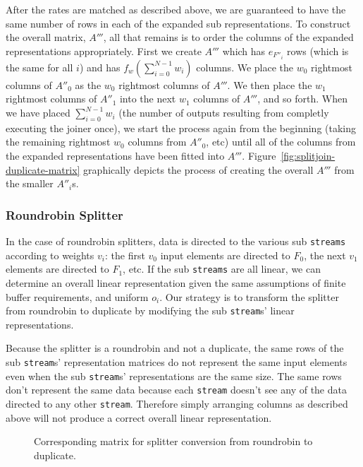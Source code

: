 After the rates are matched as described above, we are guaranteed to have the same number of rows
in each of the expanded sub representations. To construct the overall matrix, $A'''$, 
all that remains is to order the columns of the expanded representations appropriately. 
First we create $A'''$ which has $e_{F''_i}$ rows (which is the same for all $i$) and has 
$f_w(\sum_{i=0}^{N-1}w_i)$ columns. 
We place the $w_0$ rightmost columns of $A''_0$ as the $w_0$ rightmost 
columns of $A'''$. We then place the $w_1$ rightmost columns of $A''_1$ into the next $w_1$ columns 
of $A'''$, and so forth. When we have placed $\sum_{i=0}^{N-1}w_{i}$ (the number of outputs resulting from 
completly executing the joiner once), we start the process again from the beginning (taking the remaining
rightmost $w_0$ columns from $A''_0$, etc) until all of the columns from the expanded representations have
been fitted into $A'''$. Figure~\ref{fig:splitjoin-duplicate-matrix} graphically depicts the process of 
creating the overall $A'''$ from the smaller $A''_i$s.



\subsubsection{Roundrobin Splitter}

In the case of roundrobin splitters, data is directed to the various sub {\tt streams} 
according to weights $v_i$: the first $v_0$ input elements are directed to $F_0$, the next
$v_1$ elements are directed to $F_1$, etc. If the sub {\tt streams} are
all linear, we can determine an overall linear representation given the same
assumptions of finite buffer requirements, and uniform $o_i$.
Our strategy is to transform the splitter from roundrobin to duplicate by
modifying the sub {\tt stream}s' linear representations. 

Because the splitter is a roundrobin and not a duplicate, the same rows of the sub 
{\tt stream}s' representation matrices do not represent the same input elements 
even when the sub {\tt stream}s' representations are the same size. 
The same rows don't represent the same data because each {\tt stream} 
doesn't see any of the data directed to any other {\tt stream}. Therefore simply 
arranging columns as described above will not produce a correct overall linear representation. 

\begin{figure}
\center
\epsfxsize=3.0in
\caption{Corresponding matrix for splitter conversion from roundrobin to duplicate.}
\label{fig:splitjoin-roundrobin-matrix}
\end{figure}

